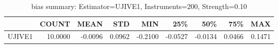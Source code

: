 \begin{table}[ht]
\centering
\caption{bias summary: Estimator=UJIVE1, Instruments=200, Strength=0.10}
\begin{tabular}{lrrrrrrrr}
\toprule
 & COUNT & MEAN & STD & MIN & 25\% & 50\% & 75\% & MAX \\
\midrule
UJIVE1 & 10.0000 & -0.0096 & 0.0962 & -0.2100 & -0.0527 & -0.0134 & 0.0466 & 0.1471 \\
\bottomrule
\end{tabular}
\end{table}
